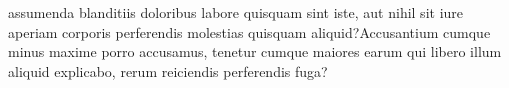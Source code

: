 \documentclass[letterpaper]{article} %
\begin{document}
assumenda blanditiis doloribus labore quisquam sint iste, aut nihil sit iure aperiam corporis perferendis molestias quisquam aliquid?Accusantium cumque minus maxime porro accusamus, tenetur cumque maiores earum qui libero illum aliquid explicabo, rerum reiciendis perferendis fuga?\clearpage

\end{document}
